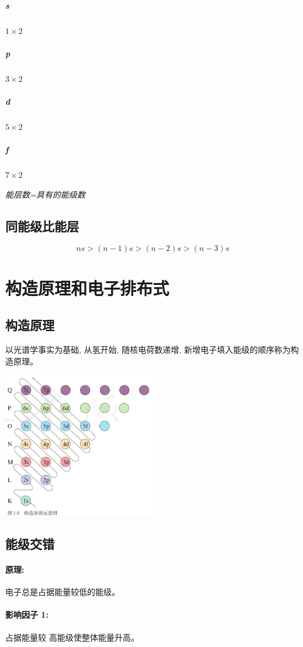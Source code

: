 \documentclass[10pt,cn]{elegantbook}
\begin{document}
	\subparagraph*{s} $ 1 \times 2 $
	
	\subparagraph*{p} $ 3 \times 2 $
	
	\subparagraph*{d} $ 5 \times 2 $
	
	\subparagraph*{f} $ 7 \times 2 $
	
	
	\textit{能层数=具有的能级数}
	
\subsection{同能级比能层}
\[ns>(n-1)s>(n-2)s>(n-3)s\]

\section{构造原理和电子排布式}

\subsection{构造原理}
	
	以光谱学事实为基础, 从氢开始, 随核电荷数递增, 新增电子填入能级的顺序称为构造原理。
	
	\begin{center}
		\includegraphics[max width=0.5\textwidth]{image/c43-2.jpg}
	\end{center}
	
	\subsection{能级交错}
	\paragraph*{原理:} 电子总是占据能量较低的能级。
	
	\paragraph*{影响因子 1:} 占据能量较 高能级使整体能量升高。
	
\end{document}

